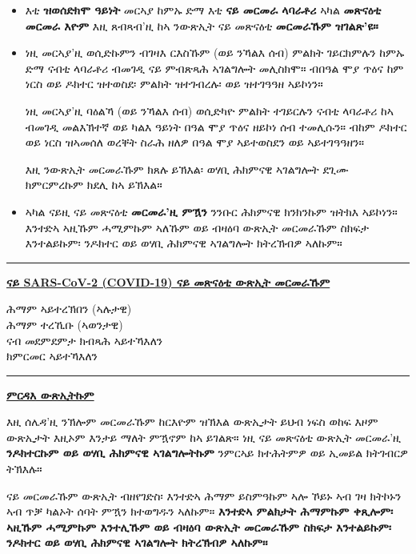 \documentclass[10pt]{article}
\newcommand{\PageLine}{\rule{\textwidth}{0.25mm}}
\begin{document}
\begin{itemize}
\item

  እቲ \textbf{ዝወሰድክሞ ዓይነት} መርኣያ ከምኡ ድማ እቲ \textbf{ናይ መርመራ ላባራቶሪ} ኣካል
  \textbf{መጽናዕቲ መርመራ እዮም} እዚ ጸብጻብ'ዚ ከኣ ንውጽኢት ናይ መጽናዕቲ
  \textbf{መርመራኹም ዝገልጽ'ዩ።}

\item
  ነዚ መርኣያ'ዚ ወሲድኩምን ብገዛእ ርእስኹም (ወይ ንኻልእ ሰብ) ምልክት ገይርክምሉን ከምኡ ድማ ናብቲ ላባራቶሪ
  ብመገዲ ናይ ምብጽጻሕ ኣገልግሎት መሊስክሞ። ብበዓል ሞያ ጥዕና ከም ነርስ ወይ ዶክተር ዝተወስደ፡ ምልክት
  ዝተገብረሉ፡ ወይ ዝተገዓዓዘ ኣይኮነን።

  ነዚ መርኣያ'ዚ ባዕልኻ (ወይ ንኻልእ ሰብ) ወሲድካዮ ምልክት ተገይርሉን ናብቲ ላባራቶሪ ከኣ ብመገዲ መልእኽተኛ
  ወይ ካልእ ዓይነት በዓል ሞያ ጥዕና ዘይኮነ ሰብ ተመሊሱን። ብከም ዶክተር ወይ ነርስ ዝኣመሰለ ወረቐት ስራሕ ዘለዎ
  በዓል ሞያ ኣይተወስደን ወይ ኣይተገዓዓዘን። 



  እዚ ንውጽኢት መርመራኹም ክጸሉ ይኽእል፡ ወሃቢ ሕክምናዊ ኣገልግሎት ደጊሙ ክምርምረኩም ክደሊ ከኣ ይኽእል።


\item

  ኣካል ናይዚ ናይ መጽናዕቲ \textbf{መርመራ'ዚ ምዃን} ንንቡር ሕክምናዊ ክንክንኩም ዝትክእ ኣይኮነን። እንተድኣ
  ኣዚኹም ሓሚምኩም ኣለኹም ወይ ብዛዕባ ውጽኢት መርመራኹም ስክፍታ እንተልይኩም፡ ንዶክተር ወይ ወሃቢ
  ሕክምናዊ ኣገልግሎት ክትረኽብዎ ኣለኩም።

\end{itemize}

\bigskip
\PageLine

\large \underline{\textbf{ናይ SARS-CoV-2 (COVID-19) ናይ መጽናዕቲ ውጽኢት መርመራኹም}}

ሕማም ኣይተረኽበን (ኣሉታዊ)\\
ሕማም ተረኺቡ (ኣወንታዊ)\\
ናብ መደምደምታ ክብጻሕ ኣይተኻእለን\\
ክምርመር ኣይተኻእለን\\

\PageLine
\bigskip

\large \underline{\textbf{ምርዳእ ውጽኢትኩም}}

እዚ ሰሌዳ'ዚ ንኽሎም መርመራኹም ከርእዮም ዝኽእል ውጽኢታት ይህብ ነፍስ ወከፍ እዞም ውጽኢታት እዚኦም እንታይ
ማለት ምዃኖም ከኣ ይገልጽ። ነዚ ናይ መጽናዕቲ ውጽኢት መርመራ'ዚ \textbf{ንዶክተርኩም ወይ ወሃቢ ሕክምናዊ
ኣገልግሎትኩም} ንምርኣይ ክተሕትምዎ ወይ ኢመይል ክትገብርዎ ትኽእሉ።

ናይ መርመራኹም ውጽኢት ብዘየገድስ፡ እንተድኣ ሕማም ይስምዓኩም ኣሎ ኾይኑ ኣብ ገዛ ክትኮኑን ኣብ ጥቓ ካልኦት
ሰባት ምዃን ክተወግዱን ኣለኩም። \textbf{እንተድኣ ምልክታት ሕማምኩም ቀጺሎም፡ ኣዚኹም ሓሚምኩም
እንተሊኹም ወይ ብዛዕባ ውጽኢት መርመራኹም ስክፍታ እንተልይኩም፡ ንዶክተር ወይ ወሃቢ ሕክምናዊ ኣገልግሎት
ክትረኽብዎ ኣለኩም።}
\end{document}
